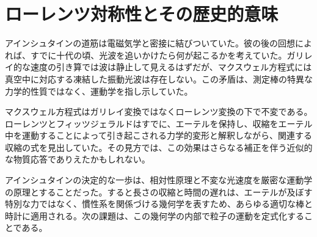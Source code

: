 \begin{classroomqa}
\end{classroomqa}

\section{ローレンツ対称性とその歴史的意味}

\begin{classroomqa}
\end{classroomqa}

アインシュタインの道筋は電磁気学と密接に結びついていた。彼の後の回想によれば、すでに十代の頃、光波を追いかけたら何が起こるかを考えていた。ガリレイ的な速度の引き算では波は静止して見えるはずだが、マクスウェル方程式には真空中に対応する凍結した振動光波は存在しない。この矛盾は、測定棒の特異な力学的性質ではなく、運動学を指し示していた。

\begin{classroomqa}
\end{classroomqa}

マクスウェル方程式はガリレイ変換ではなくローレンツ変換の下で不変である。ローレンツとフィッツジェラルドはすでに、エーテルを保持し、収縮をエーテル中を運動することによって引き起こされる力学的変形と解釈しながら、関連する収縮の式を見出していた。その見方では、この効果はさらなる補正を伴う近似的な物質応答でありえたかもしれない。

アインシュタインの決定的な一歩は、相対性原理と不変な光速度を厳密な運動学の原理とすることだった。すると長さの収縮と時間の遅れは、エーテルが及ぼす特別な力ではなく、慣性系を関係づける幾何学を表すため、あらゆる適切な棒と時計に適用される。次の課題は、この幾何学の内部で粒子の運動を定式化することである。
